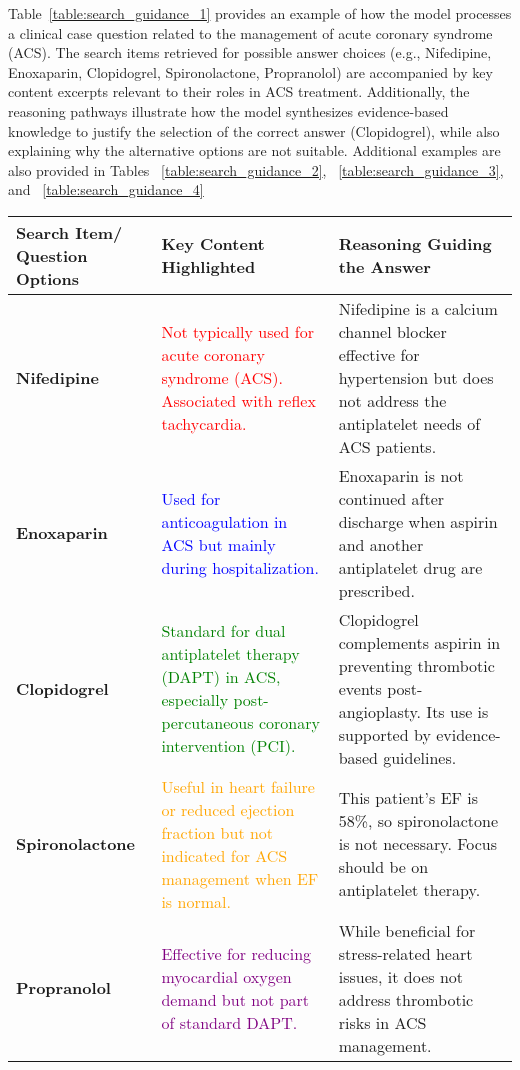 Table~\ref{table:search_guidance_1} provides an example of how the model processes a clinical case question related to the management of acute coronary syndrome (ACS). The search items retrieved for possible answer choices (e.g., Nifedipine, Enoxaparin, Clopidogrel, Spironolactone, Propranolol) are accompanied by key content excerpts relevant to their roles in ACS treatment. Additionally, the reasoning pathways illustrate how the model synthesizes evidence-based knowledge to justify the selection of the correct answer (Clopidogrel), while also explaining why the alternative options are not suitable. Additional examples are also provided in Tables ~\ref{table:search_guidance_2}, ~\ref{table:search_guidance_3}, and ~\ref{table:search_guidance_4}
\label{app:examples-medqa}
\begin{table*}[h!]
\centering
\begin{tabular}{|p{3cm}|p{4cm}|p{4cm}|}
\hline
\textbf{Search Item/ Question Options} & \textbf{Key Content Highlighted} & \textbf{Reasoning Guiding the Answer} \\ \hline
\textbf{Nifedipine} &
\textcolor{red}{Not typically used for acute coronary syndrome (ACS). Associated with reflex tachycardia.} &
Nifedipine is a calcium channel blocker effective for hypertension but does not address the antiplatelet needs of ACS patients. \\ \hline
\textbf{Enoxaparin} &
\textcolor{blue}{Used for anticoagulation in ACS but mainly during hospitalization.} &
Enoxaparin is not continued after discharge when aspirin and another antiplatelet drug are prescribed. \\ \hline
\textbf{Clopidogrel} &
\textcolor{green}{Standard for dual antiplatelet therapy (DAPT) in ACS, especially post-percutaneous coronary intervention (PCI).} &
Clopidogrel complements aspirin in preventing thrombotic events post-angioplasty. Its use is supported by evidence-based guidelines. \\ \hline
\textbf{Spironolactone} &
\textcolor{orange}{Useful in heart failure or reduced ejection fraction but not indicated for ACS management when EF is normal.} &
This patient's EF is 58\%, so spironolactone is not necessary. Focus should be on antiplatelet therapy. \\ \hline
\textbf{Propranolol} &
\textcolor{purple}{Effective for reducing myocardial oxygen demand but not part of standard DAPT.} &
While beneficial for stress-related heart issues, it does not address thrombotic risks in ACS management. \\ \hline

\end{tabular}
\end{table*}
